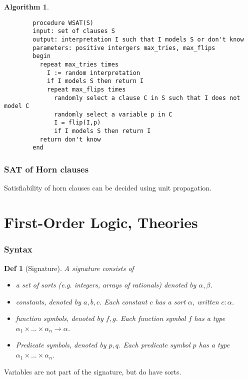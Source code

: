\documentclass[]{article}
\newtheorem*{definition*}{Def}
\newtheorem{algorithm}{Algorithm}
\begin{document}
\begin{algorithm}
	\begin{verbatim}
		procedure WSAT(S)
		input: set of clauses S
		output: interpretation I such that I models S or don't know
		parameters: positive intergers max_tries, max_flips
		begin
		  repeat max_tries times
		    I := random interpretation
		    if I models S then return I
		    repeat max_flips times
		      randomly select a clause C in S such that I does not model C
		      randomly select a variable p in C
		      I = flip(I,p)
		      if I models S then return I
		  return don't know
		end
	\end{verbatim}
\end{algorithm}

\subsubsection{SAT of Horn clauses}

Satisfiability of horn clauses can be decided using unit propagation.

\section{First-Order Logic, Theories}

\subsubsection{Syntax}

\begin{definition*}[Signature]
	A signature consists of
	\begin{itemize}
		\item a set of sorts (e.g. integers, arrays of rationals) denoted by $\alpha, \beta$.
		\item constants, denoted by $a,b,c$. Each constant $c$ has a sort $\alpha$, written $c: \alpha$.
		\item function symbols, denoted by $f,g$. Each function symbol $f$ has a type $\alpha_1 \times ... \times \alpha_n \rightarrow \alpha$.
		\item Predicate symbols, denoted by $p,q$. Each predicate symbol $p$ has a type $\alpha_1 \times ... \times \alpha_n$.
	\end{itemize}
\end{definition*}

Variables are not part of the signature, but do have sorts.
\end{document}

